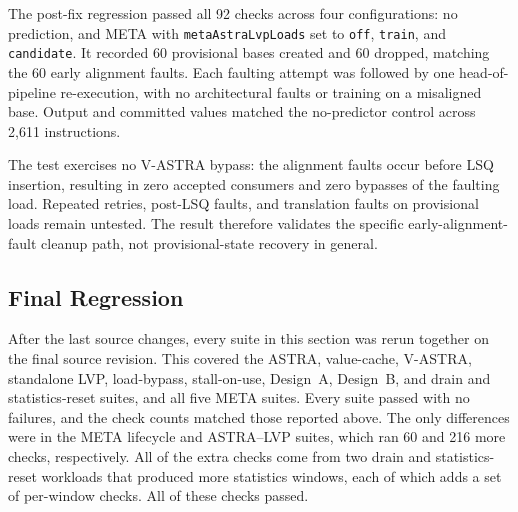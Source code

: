 The post-fix regression passed all 92 checks across four
configurations: no prediction, and META with
\texttt{metaAstraLvpLoads} set to \texttt{off}, \texttt{train}, and
\texttt{candidate}. It recorded 60 provisional bases created and
60 dropped, matching the 60 early alignment faults. Each faulting
attempt was followed by one head-of-pipeline re-execution, with no
architectural faults or training on a misaligned base. Output and
committed values matched the no-predictor control across 2,611
instructions.

The test exercises no V-ASTRA bypass: the alignment faults occur
before LSQ insertion, resulting in zero accepted consumers and zero
bypasses of the faulting load. Repeated retries, post-LSQ faults, and
translation faults on provisional loads remain untested. The result
therefore validates the specific early-alignment-fault cleanup path,
not provisional-state recovery in general.

\subsection{Final Regression}
\label{subsec:final-regression}

After the last source changes, every suite in this section was rerun
together on the final source revision. This covered the ASTRA,
value-cache, V-ASTRA, standalone LVP, load-bypass, stall-on-use,
Design~A, Design~B, and drain and statistics-reset suites, and all
five META suites. Every suite passed with no failures, and the check
counts matched those reported above. The only differences were in the
META lifecycle and ASTRA--LVP suites, which ran 60 and 216 more checks,
respectively. All of the extra checks come from two drain and
statistics-reset workloads that produced more statistics windows, each
of which adds a set of per-window checks. All of these checks passed.
